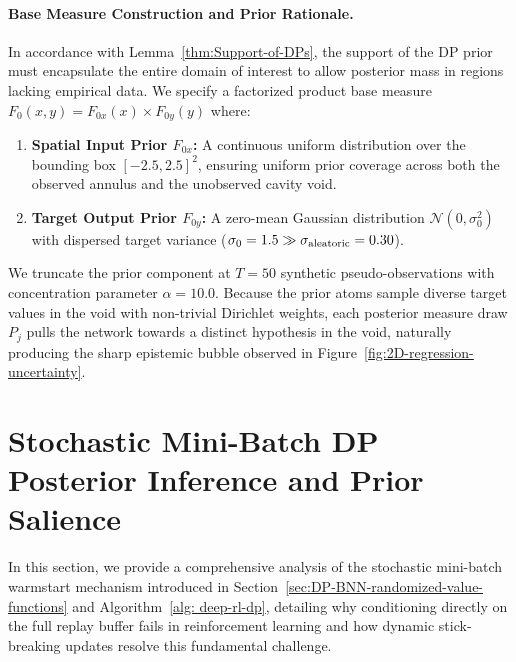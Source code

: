 \documentclass[10pt]{article}
\begin{document}
\paragraph{Base Measure Construction and Prior Rationale.}
In accordance with Lemma~\ref{thm:Support-of-DPs}, the support of the DP prior must encapsulate the entire domain of interest to allow posterior mass in regions lacking empirical data. We specify a factorized product base measure $F_0(x, y) = F_{0x}(x) \times F_{0y}(y)$ where:
\begin{enumerate}
    \item \textbf{Spatial Input Prior $F_{0x}$:} A continuous uniform distribution over the bounding box $[-2.5, 2.5]^2$, ensuring uniform prior coverage across both the observed annulus and the unobserved cavity void.
    \item \textbf{Target Output Prior $F_{0y}$:} A zero-mean Gaussian distribution $\mathcal{N}(0, \sigma_0^2)$ with dispersed target variance ($\sigma_0 = 1.5 \gg \sigma_{\rm aleatoric} = 0.30$).
\end{enumerate}
We truncate the prior component at $T = 50$ synthetic pseudo-observations with concentration parameter $\alpha = 10.0$. Because the prior atoms sample diverse target values in the void with non-trivial Dirichlet weights, each posterior measure draw $P_j$ pulls the network towards a distinct hypothesis in the void, naturally producing the sharp epistemic bubble observed in Figure~\ref{fig:2D-regression-uncertainty}.

\section{Stochastic Mini-Batch DP Posterior Inference and Prior Salience}
\label{sec:stochastic-warmstart-theory-appendix}

In this section, we provide a comprehensive analysis of the stochastic mini-batch warmstart mechanism introduced in Section~\ref{sec:DP-BNN-randomized-value-functions} and Algorithm~\ref{alg: deep-rl-dp}, detailing why conditioning directly on the full replay buffer fails in reinforcement learning and how dynamic stick-breaking updates resolve this fundamental challenge.
\end{document}

